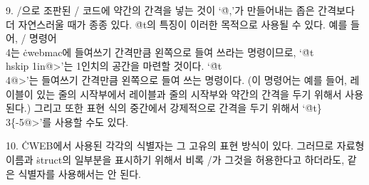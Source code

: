 9. \TEX/으로 조판된 \CEE/ 코드에 약간의 간격을 넣는 것이 `\.{@,}'가
만들어내는 좁은 간격보다 더 자연스러울 때가 종종 있다.  \.{@t}의
특징이 이러한 목적으로 사용될 수 있다. 예를 들어, \TEX/
명령어 \.{\\4}는 \.{cwebmac}에 들여쓰기 간격만큼 왼쪽으로 들여 쓰라는
명령이므로, `\.{@t\\hskip 1in@>}'는 1인치의 공간을 마련할
것이다. `\.{@t\\4@>}'는 들여쓰기 간격만큼 왼쪽으로 들여 쓰는 명령이다. 
(이 명령어는 예를 들어, 레이블이 있는 줄의 시작부에서 레이블과 줄의
시작부와 약간의 간격을 두기 위해서 사용된다.) 그리고 또한 표현 식의
중간에서 강제적으로 간격을 두기 위해서 `\.{@t\}\\3\{-5@>}'를 사용할
수도 있다.

10. \.{CWEB}에서 사용된 각각의 식별자는 그 고유의 표현 방식이
있다. 그러므로 자료형 이름과 \.{struct}의 일부분을 표시하기 위해서
비록 \CEE/가 그것을 허용한다고 하더라도, 같은 식별자를 사용해서는
안 된다. 

